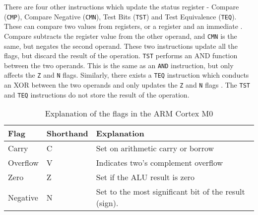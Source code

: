 \documentclass[12pt,a4paper]{article}
\begin{document}
\begin{bibunit}[is-unsrt]
There are four other instructions which update the status register - Compare (\texttt{CMP}), Compare Negative (\texttt{CMN}), Test Bits (\texttt{TST}) and Test Equivalence (\texttt{TEQ}).
These can compare two values from registers, or a register and an immediate \cite{ARM:CMPCMN}.
Compare subtracts the register value from the other operand, and \texttt{CMN} is the same, but negates the second operand.
These two instructions update all the flags, but discard the result of the operation.
\texttt{TST} performs an AND function between the two operands. 
This is the same as an \texttt{AND} instruction, but only affects the \texttt{Z} and \texttt{N} flags.
Similarly, there exists a \texttt{TEQ} instruction which conducts an XOR between the two operands and only updates the \texttt{Z} and \texttt{N} flags \cite{ARM:TSTTEQ}.
The \texttt{TST} and \texttt{TEQ} instructions do not store the result of the operation.


%

\begin{table}
\centering
\caption{Explanation of the flags in the ARM Cortex M0}
\label{tab:m0:flags}
\begin{tabular}{p{}p{}p{}}\hline
Flag & Shorthand & Explanation \\ \hline
Carry & C & Set on arithmetic carry or borrow\\
Overflow & V & Indicates two's complement overflow\\
Zero & Z & Set if the ALU result is zero\\
Negative & N & Set to the most significant bit of the result (sign). \\
\end{tabular}
\end{table}

\end{bibunit}
\end{document}
